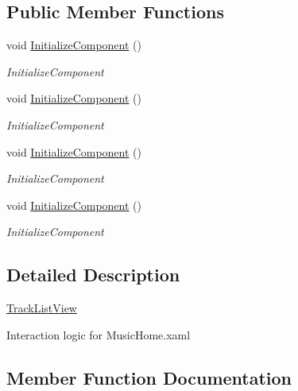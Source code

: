 \subsection*{Public Member Functions}
\begin{DoxyCompactItemize}
\item 
void \hyperlink{class_presentation_1_1_view_1_1_list_1_1_track_list_view_a86e2e69667d5d62053af1e28d00daaee}{Initialize\+Component} ()
\begin{DoxyCompactList}\small\item\em Initialize\+Component \end{DoxyCompactList}\item 
void \hyperlink{class_presentation_1_1_view_1_1_list_1_1_track_list_view_a86e2e69667d5d62053af1e28d00daaee}{Initialize\+Component} ()
\begin{DoxyCompactList}\small\item\em Initialize\+Component \end{DoxyCompactList}\item 
void \hyperlink{class_presentation_1_1_view_1_1_list_1_1_track_list_view_a86e2e69667d5d62053af1e28d00daaee}{Initialize\+Component} ()
\begin{DoxyCompactList}\small\item\em Initialize\+Component \end{DoxyCompactList}\item 
void \hyperlink{class_presentation_1_1_view_1_1_list_1_1_track_list_view_a86e2e69667d5d62053af1e28d00daaee}{Initialize\+Component} ()
\begin{DoxyCompactList}\small\item\em Initialize\+Component \end{DoxyCompactList}\end{DoxyCompactItemize}


\subsection{Detailed Description}
\hyperlink{class_presentation_1_1_view_1_1_list_1_1_track_list_view}{Track\+List\+View} 

Interaction logic for Music\+Home.\+xaml 

\subsection{Member Function Documentation}
\mbox{\label{class_presentation_1_1_view_1_1_list_1_1_track_list_view_a86e2e69667d5d62053af1e28d00daaee}} 
